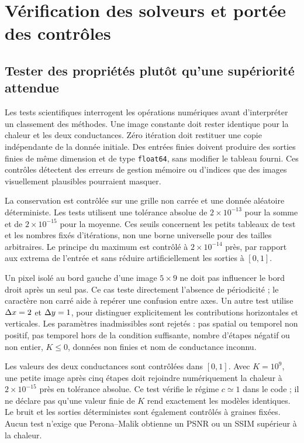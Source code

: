 \section{Vérification des solveurs et portée des contrôles}
\label{sec:verification}

\subsection{Tester des propriétés plutôt qu'une supériorité attendue}

Les tests scientifiques interrogent les opérations numériques avant
d'interpréter un classement des méthodes. Une image constante doit
rester identique pour la chaleur et les deux conductances. Zéro
itération doit restituer une copie indépendante de la donnée initiale.
Des entrées finies doivent produire des sorties finies de même
dimension et de type \texttt{float64}, sans modifier le tableau fourni.
Ces contrôles détectent des erreurs de gestion mémoire ou d'indices
que des images visuellement plausibles pourraient masquer.

La conservation est contrôlée sur une grille non carrée et une donnée
aléatoire déterministe. Les tests utilisent une tolérance absolue de
$2\times10^{-13}$ pour la somme et de $2\times10^{-15}$ pour la moyenne.
Ces seuils concernent les petits tableaux de test et les nombres
fixés d'itérations, non une borne universelle pour des tailles
arbitraires. Le principe du maximum est contrôlé à
$2\times10^{-14}$ près, par rapport aux extrema de l'entrée et sans
réduire artificiellement les sorties à $[0,1]$.

Un pixel isolé au bord gauche d'une image $5\times9$ ne doit pas
influencer le bord droit après un seul pas. Ce cas teste directement
l'absence de périodicité ; le caractère non carré aide à repérer une
confusion entre axes. Un autre test utilise $\Delta x=2$ et $\Delta y=1$,
pour distinguer explicitement les contributions horizontales et
verticales. Les paramètres inadmissibles sont rejetés : pas spatial
ou temporel non positif, pas temporel hors de la condition suffisante,
nombre d'étapes négatif ou non entier, $K\leq0$, données non finies
et nom de conductance inconnu.

Les valeurs des deux conductances sont contrôlées dans $[0,1]$.
Avec $K=10^9$, une petite image après cinq étapes doit rejoindre
numériquement la chaleur à $2\times10^{-15}$ près en tolérance
absolue. Ce test vérifie le régime $c\simeq1$ dans le code ; il ne
déclare pas qu'une valeur finie de $K$ rend exactement les modèles
identiques. Le bruit et les sorties déterministes sont également
contrôlés à graines fixées. Aucun test n'exige que Perona--Malik
obtienne un PSNR ou un SSIM supérieur à la chaleur.

